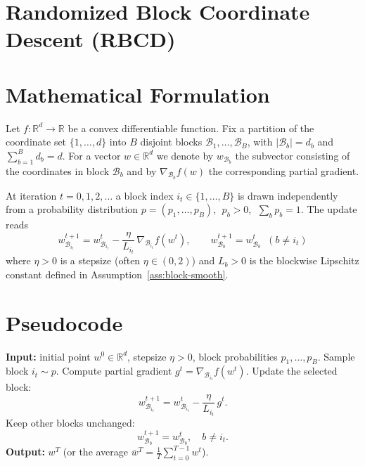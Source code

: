 \documentclass{article}
\newcommand{\R}{\mathbb{R}}
\begin{document}
\section*{Randomized Block Coordinate Descent (RBCD)}

\section*{Mathematical Formulation}
Let $f:\R^{d}\rightarrow\R$ be a convex differentiable function.  
Fix a partition of the coordinate set $\{1,\dots ,d\}$ into $B$ disjoint blocks  
$\mathcal{B}_{1},\dots ,\mathcal{B}_{B}$, with $|\mathcal{B}_{b}|=d_{b}$ and $\sum_{b=1}^{B}d_{b}=d$.  
For a vector $w\in\R^{d}$ we denote by $w_{\mathcal{B}_{b}}$ the subvector consisting of the
coordinates in block $\mathcal{B}_{b}$ and by $\nabla_{\mathcal{B}_{b}}f(w)$ the corresponding partial gradient.

At iteration $t=0,1,2,\dots$ a block index $i_{t}\in\{1,\dots ,B\}$ is drawn
independently from a probability distribution $p=(p_{1},\dots ,p_{B})$,
$\;p_{b}>0$, $\;\sum_{b}p_{b}=1$.
The update reads
\[
\boxed{
\;w^{t+1}_{\mathcal{B}_{i_{t}}}=w^{t}_{\mathcal{B}_{i_{t}}}
-\frac{\eta}{L_{i_{t}}}\,\nabla_{\mathcal{B}_{i_{t}}}f\!\left(w^{t}\right),\qquad
w^{t+1}_{\mathcal{B}_{b}}=w^{t}_{\mathcal{B}_{b}}\;\;(b\neq i_{t})\;}
\tag{1}
\]
where $\eta>0$ is a stepsize (often $\eta\in(0,2)$) and $L_{b}>0$ is the blockwise
Lipschitz constant defined in Assumption~\ref{ass:block-smooth}.

\section*{Pseudocode}
\begin{algorithm}[H]
\caption{Randomized Block Coordinate Descent}
\begin{algorithmic}[1]
\State \textbf{Input:} initial point $w^{0}\in\R^{d}$, stepsize $\eta>0$, block probabilities $p_{1},\dots ,p_{B}$.
    \State Sample block $i_{t}\sim p$.
    \State Compute partial gradient $g^{t}= \nabla_{\mathcal{B}_{i_{t}}}f(w^{t})$.
    \State Update the selected block:
    \[
        w^{t+1}_{\mathcal{B}_{i_{t}}}=w^{t}_{\mathcal{B}_{i_{t}}}-\frac{\eta}{L_{i_{t}}}\,g^{t}.
    \]
    \State Keep other blocks unchanged:
    \[
        w^{t+1}_{\mathcal{B}_{b}}=w^{t}_{\mathcal{B}_{b}},\quad b\neq i_{t}.
    \]
\EndFor
\State \textbf{Output:} $w^{T}$ (or the average $\bar w^{T}=\frac1T\sum_{t=0}^{T-1}w^{t}$).
\end{algorithmic}
\end{algorithm}
\end{document}

